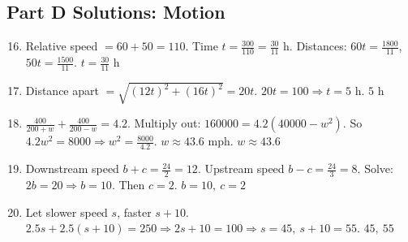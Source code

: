 \documentclass[12pt]{article}
\begin{document}
\subsection*{Part D Solutions: Motion}
\begin{enumerate}
  \setcounter{enumi}{15}
  \item Relative speed \(=60+50=110\). Time \(t=\frac{300}{110}=\frac{30}{11}\) h.  
  Distances: \(60t=\frac{1800}{11}\), \(50t=\frac{1500}{11}\). \(\boxed{t=\tfrac{30}{11}\text{ h}}\)

  \item Distance apart \(= \sqrt{(12t)^2+(16t)^2}=20t\).  
  \(20t=100 \Rightarrow t=5\) h. \(\boxed{5\text{ h}}\)

  \item \( \frac{400}{200+w}+\frac{400}{200-w}=4.2\).  
  Multiply out: \(160000=4.2(40000-w^2)\). So \(4.2w^2=8000 \Rightarrow w^2=\frac{8000}{4.2}\).  
  \(w\approx 43.6\) mph. \(\boxed{w\approx43.6}\)

  \item Downstream speed \(b+c= \frac{24}{2}=12\). Upstream speed \(b-c= \frac{24}{3}=8\).  
  Solve: \(2b=20 \Rightarrow b=10\). Then \(c=2\). \(\boxed{b=10,\ c=2}\)

  \item Let slower speed \(s\), faster \(s+10\).  
  \(2.5s+2.5(s+10)=250 \Rightarrow 2s+10=100 \Rightarrow s=45,\ s+10=55\). \(\boxed{45,\ 55}\)
\end{enumerate}
\end{document}
